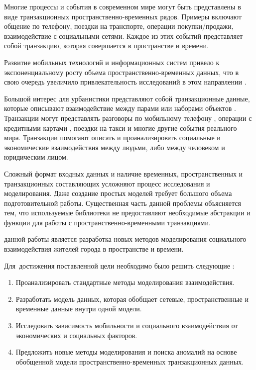 {\actuality}
Многие процессы и события в современном мире могут быть представлены в виде транзакционных пространственно-временных рядов. Примеры включают общение по телефону, поездки на транспорте, операции покупки/продажи, взаимодействие с социальными сетями. Каждое из этих событий представляет собой транзакцию, которая совершается в пространстве и времени. 

Развитие мобильных технологий и информационных систем привело к экспоненциальному росту объема пространственно-временных данных, что в свою очередь увеличило привлекательность исследований в этом направлении \autocite{roddick1999bibliography,cressie2015statistics,diggle2013statistical}. 

Большой интерес для урбанистики представляют собой транзакционные данные, которые описывают взаимодействие между парами или наборами объектов \cite{hawelka2014geo,paldino2015urban, ratti2010redrawing, sobolevsky2013delineating}. Транзакции могут представлять разговоры по мобильному телефону \cite{belyi2017global, kung2014exploring, amini2014impact}, операции с кредитными картами \cite{sobolevsky2016cities}, поездки на такси \cite{santi2014quantifying} и многие другие события реального мира. Транзакции помогают описать  и проанализировать социальные и экономические взаимодействия между людьми, либо между человеком и юридическим лицом.

{\progress}
Сложный формат входных данных и наличие временных, пространственных и транзакционных составляющих усложняют процесс исследования и моделирования. Даже создание простых моделей требует большого объема подготовительной работы. Существенная часть данной проблемы объясняется тем, что используемые библиотеки не предоставляют необходимые абстракции и функции для работы с пространственно-временными транзакциями.

{\aim} данной работы является разработка новых методов моделирования социального взаимодействия жителей города в пространстве и времени.

Для~достижения поставленной цели необходимо было решить следующие {\tasks}:
\begin{enumerate}[beginpenalty=10000] %
  \item Проанализировать стандартные методы моделирования взаимодействия.
  \item Разработать модель данных, которая обобщает сетевые, пространственные и временные данные внутри одной модели.
  \item Исследовать зависимость мобильности и социального взаимодействия от экономических и социальных факторов.
  \item Предложить новые методы моделирования и поиска аномалий на основе обобщенной модели пространственно-временных транзакционных данных.
\end{enumerate}


